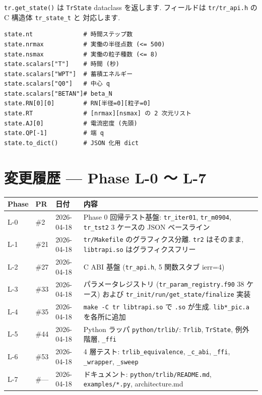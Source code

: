 \documentclass[11pt,a4paper]{report}
\begin{document}
\texttt{tr.get\_state()} は \texttt{TrState} dataclass を返します.
フィールドは \texttt{tr/tr\_api.h} の C 構造体 \texttt{tr\_state\_t} と
対応します.

\begin{lstlisting}[style=py]
state.nt              # 時間ステップ数
state.nrmax           # 実働の半径点数 (<= 500)
state.nsmax           # 実働の粒子種数 (<= 8)
state.scalars["T"]    # 時間 (秒)
state.scalars["WPT"]  # 蓄積エネルギー
state.scalars["Q0"]   # 中心 q
state.scalars["BETAN"]# beta_N
state.RN[0][0]        # RN[半径=0][粒子=0]
state.RT              # [nrmax][nsmax] の 2 次元リスト
state.AJ[0]           # 電流密度 (先頭)
state.QP[-1]          # 端 q
state.to_dict()       # JSON 化用 dict
\end{lstlisting}

\section{変更履歴 — Phase L-0 〜 L-7}

\begin{center}
\begin{tabular}{@{}lllp{6.5cm}@{}}
\toprule
Phase & PR  & 日付        & 内容 \\ \midrule
L-0   & \#2 & 2026-04-18 & Phase 0 回帰テスト基盤: \texttt{tr\_iter01}, \texttt{tr\_m0904}, \texttt{tr\_tst2} 3 ケースの JSON ベースライン \\
L-1   & \#21 & 2026-04-18 & \texttt{tr/Makefile} のグラフィクス分離. \texttt{tr2} はそのまま, \texttt{libtrapi.so} はグラフィクスフリー \\
L-2   & \#27 & 2026-04-18 & C ABI 基盤 (\texttt{tr\_api.h}, 5 関数スタブ ierr=4) \\
L-3   & \#33 & 2026-04-18 & パラメータレジストリ (\texttt{tr\_param\_registry.f90} 38 ケース) および \texttt{tr\_init/run/get\_state/finalize} 実装 \\
L-4   & \#35 & 2026-04-18 & \texttt{make -C tr libtrapi.so} で \texttt{.so} が生成. \texttt{lib*\_pic.a} を各所に追加 \\
L-5   & \#44 & 2026-04-18 & Python ラッパ \texttt{python/trlib/}: \texttt{Trlib}, \texttt{TrState}, 例外階層, \texttt{\_ffi} \\
L-6   & \#53 & 2026-04-18 & 4 層テスト: \texttt{trlib\_equivalence}, \texttt{\_c\_abi}, \texttt{\_ffi}, \texttt{\_wrapper}, \texttt{\_sweep} \\
L-7   & \#--- & 2026-04-18 & ドキュメント: \texttt{python/trlib/README.md}, \texttt{examples/*.py}, architecture.md \\
\bottomrule
\end{tabular}
\end{center}
\end{document}
